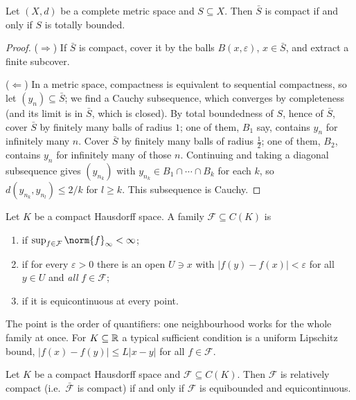 \documentclass[a4paper]{scrartcl}
\begin{document}
\begin{proposition}
	Let $(X,d)$ be a complete metric space and $S \subseteq X$. Then $\bar S$ is compact if and only if $S$ is totally bounded.
\end{proposition}

\begin{proof}
	($\Rightarrow$) If $\bar S$ is compact, cover it by the balls $B(x,\varepsilon)$, $x \in \bar S$, and extract a finite subcover.

	($\Leftarrow$) In a metric space, compactness is equivalent to sequential compactness, so let $(y_n) \subseteq \bar S$; we find a Cauchy subsequence, which converges by completeness (and its limit is in $\bar S$, which is closed). By total boundedness of $S$, hence of $\bar S$, cover $\bar S$ by finitely many balls of radius $1$; one of them, $B_1$ say, contains $y_n$ for infinitely many $n$. Cover $\bar S$ by finitely many balls of radius $\frac12$; one of them, $B_2$, contains $y_n$ for infinitely many of those $n$. Continuing and taking a diagonal subsequence gives $(y_{n_k})$ with $y_{n_k} \in B_1 \cap \cdots \cap B_k$ for each $k$, so $d(y_{n_k}, y_{n_l}) \leq 2/k$ for $l \geq k$. This subsequence is Cauchy.
\end{proof}

\begin{definition}[Equicontinuity]
	Let $K$ be a compact Hausdorff space. A family $\mathcal{F} \subseteq C(K)$ is
	\begin{enumerate}[label=(\roman*)]
		\item {} if $\sup_{f \in \mathcal{F}} \norm{f}_\infty < \infty$;
		\item {} if for every $\varepsilon > 0$ there is an open $U \ni x$ with $|f(y) - f(x)| < \varepsilon$ for all $y \in U$ and \emph{all} $f \in \mathcal{F}$;
		\item {} if it is equicontinuous at every point.
	\end{enumerate}
\end{definition}

The point is the order of quantifiers: one neighbourhood works for the whole family at once. For $K \subseteq \mathbb{R}$ a typical sufficient condition is a uniform Lipschitz bound, $|f(x)-f(y)| \leq L|x-y|$ for all $f \in \mathcal{F}$.

\begin{theorem}
	Let $K$ be a compact Hausdorff space and $\mathcal{F} \subseteq C(K)$. Then $\mathcal{F}$ is relatively compact (i.e.\ $\bar{\mathcal{F}}$ is compact) if and only if $\mathcal{F}$ is equibounded and equicontinuous.
\end{theorem}
\end{document}
